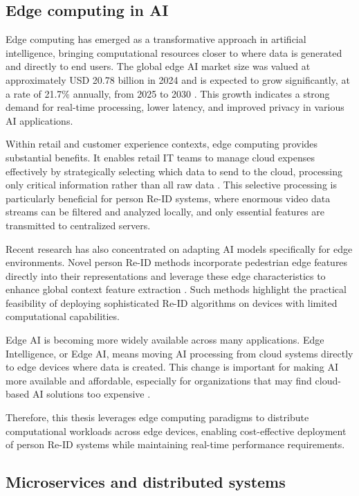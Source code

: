 \documentclass[../main.tex]{subfiles}
\begin{document}
\subsection{Edge computing in AI}
\label{sec:edgecomputing}

Edge computing has emerged as a transformative approach in artificial intelligence, bringing computational resources closer to where data is generated and directly to end users. The global edge AI market size was valued at approximately USD 20.78 billion in 2024 and is expected to grow significantly, at a rate of 21.7\% annually, from 2025 to 2030 \cite{grandview2024}. This growth indicates a strong demand for real-time processing, lower latency, and improved privacy in various AI applications.

Within retail and customer experience contexts, edge computing provides substantial benefits. It enables retail IT teams to manage cloud expenses effectively by strategically selecting which data to send to the cloud, processing only critical information rather than all raw data \cite{biztech2024}. This selective processing is particularly beneficial for person Re-ID systems, where enormous video data streams can be filtered and analyzed locally, and only essential features are transmitted to centralized servers.

Recent research has also concentrated on adapting AI models specifically for edge environments. Novel person Re-ID methods incorporate pedestrian edge features directly into their representations and leverage these edge characteristics to enhance global context feature extraction \cite{mdpi2024_edge}. Such methods highlight the practical feasibility of deploying sophisticated Re-ID algorithms on devices with limited computational capabilities.

Edge AI is becoming more widely available across many applications. Edge Intelligence, or Edge AI, means moving AI processing from cloud systems directly to edge devices where data is created. This change is important for making AI more available and affordable, especially for organizations that may find cloud-based AI solutions too expensive \cite{viso2024}.

Therefore, this thesis leverages edge computing paradigms to distribute computational workloads across edge devices, enabling cost-effective deployment of person Re-ID systems while maintaining real-time performance requirements.

\subsection{Microservices and distributed systems}
\label{sec:microservice}
\end{document}
